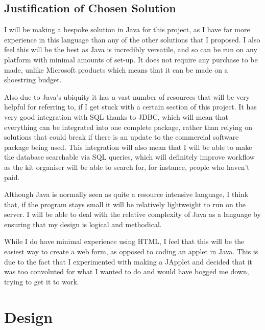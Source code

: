 \documentclass[
11pt, %
a4paper, %
oneside, %
headinclude,footinclude, %
BCOR5mm, %
]{scrartcl}
\begin{document}
\subsection{Justification of Chosen Solution}
I will be making a bespoke solution in Java for this project, as I have far more experience in this language than any of the other solutions that I proposed. I also feel this will be the best as Java is incredibly versatile, and so can be run on any platform with minimal amounts of set-up. It does not require any purchase to be made, unlike Microsoft products which means that it can be made on a shoestring budget. \par Also due to Java's ubiquity it has a vast number of resources that will be very helpful for referring to, if I get stuck with a certain section of this project. It has very good integration with SQL thanks to JDBC, which will mean that everything can be integrated into one complete package, rather than relying on solutions that could break if there is an update to the commercial software package being used. This integration will also mean that I will be able to make the database searchable via SQL queries, which will definitely improve workflow as the kit organiser will be able to search for, for instance, people who haven't paid. \par Although Java is normally seen as quite a resource intensive language, I think that, if the program stays small it will be relatively lightweight to run on the server. I will be able to deal with the relative complexity of Java as a language by ensuring that my design is logical and methodical. \par While I do have minimal experience using HTML, I feel that this will be the easiest way to create a web form, as opposed to coding an applet in Java. This is due to the fact that I experimented with making a JApplet and decided that it was too convoluted for what I wanted to do and would have bogged me down, trying to get it to work. 




\section{Design}
\end{document}
